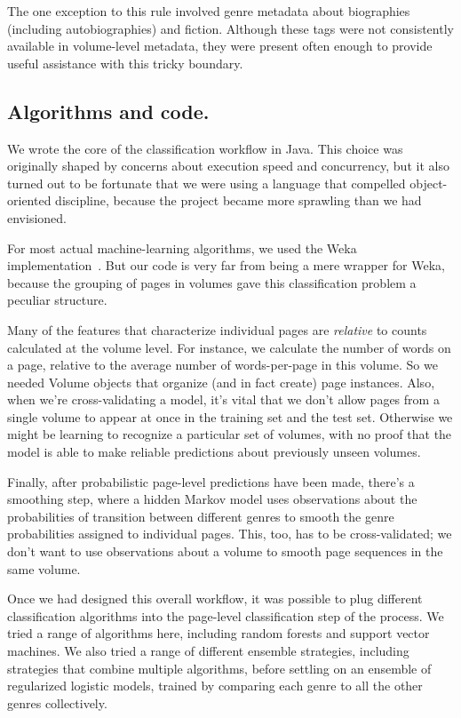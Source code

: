 \documentclass[paper=a4, fontsize=12pt]{scrartcl}
\numberwithin{equation}{section}		%
\numberwithin{figure}{section}			%
\numberwithin{table}{section}				%
\begin{document}
The one exception to this rule involved genre metadata about biographies (including autobiographies) and fiction. Although these tags were not consistently available in volume-level metadata, they were present often enough to provide useful assistance with this tricky boundary.

\subsection{Algorithms and code.}

We wrote the core of the classification workflow in Java. This choice was originally shaped by concerns about execution speed and concurrency, but it also turned out to be fortunate that we were using a language that compelled object-oriented discipline, because the project became more sprawling than we had envisioned. 

For most actual machine-learning algorithms, we used the Weka implementation~\cite{weka}. But our code is very far from being a mere wrapper for Weka, because the grouping of pages in volumes gave this classification problem a peculiar structure. 

Many of the features that characterize individual pages are \textit{relative} to counts calculated at the volume level. For instance, we calculate the number of words on a page, relative to the average number of words-per-page in this volume. So we needed Volume objects that organize (and in fact create) page instances. Also, when we're cross-validating a model, it's vital that we don't allow pages from a single volume to appear at once in the training set and the test set. Otherwise we might be learning to recognize a particular set of volumes, with no proof that the model is able to make reliable predictions about previously unseen volumes.

Finally, after probabilistic page-level predictions have been made, there's a smoothing step, where a hidden Markov model uses observations about the probabilities of transition between different genres to smooth the genre probabilities assigned to individual pages. This, too, has to be cross-validated; we don't want to use observations about a volume to smooth page sequences in the same volume.

Once we had designed this overall workflow, it was possible to plug different classification algorithms into the page-level classification step of the process. We tried a range of algorithms here, including random forests and support vector machines. We also tried a range of different ensemble strategies, including strategies that combine multiple algorithms, before settling on an ensemble of regularized logistic models, trained by comparing each genre to all the other genres collectively.
\end{document}
